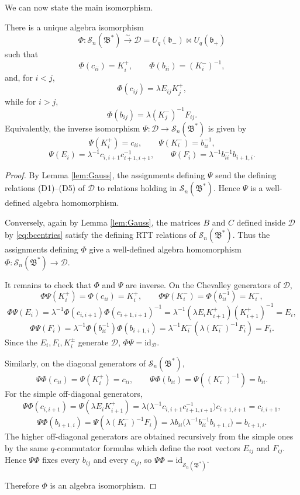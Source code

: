 \documentclass[11pt]{article}
\newcommand{\cS}{\mathcal S}
\newcommand{\fb}{\mathfrak b}
\newcommand{\Uq}{U_q}
\newcommand{\bipr}{\bowtie}
\newcommand{\id}{\mathrm{id}}
\begin{document}
We can now state the main isomorphism.

\begin{theorem}\label{thm:main}
There is a unique algebra isomorphism
\[
\Phi:\cS_n(\mathfrak B^*)\xrightarrow{\sim}\mathcal D
=\Uq(\fb_-)\bipr\Uq(\fb_+)
\]
such that
\[
\Phi(c_{ii})=K_i^+,\qquad
\Phi(b_{ii})=(K_i^-)^{-1},
\]
and, for \(i<j\),
\[
\Phi(c_{ij})=\lambda E_{ij}K_j^+,
\]
while for \(i>j\),
\[
\Phi(b_{ij})=\lambda (K_j^-)^{-1}F_{ij}.
\]
Equivalently, the inverse isomorphism \(\Psi:\mathcal D\to\cS_n(\mathfrak B^*)\) is given by
\[
\Psi(K_i^+)=c_{ii},\qquad
\Psi(K_i^-)=b_{ii}^{-1},
\]
\[
\Psi(E_i)=\lambda^{-1}c_{i,i+1}c_{i+1,i+1}^{-1},\qquad
\Psi(F_i)=\lambda^{-1}b_{ii}^{-1}b_{i+1,i}.
\]
\end{theorem}

\begin{proof}
By Lemma \ref{lem:Gauss}, the assignments defining \(\Psi\) send the defining relations (D1)--(D5) of \(\mathcal D\) to relations holding in \(\cS_n(\mathfrak B^*)\).  Hence \(\Psi\) is a well-defined algebra homomorphism.

Conversely, again by Lemma \ref{lem:Gauss}, the matrices \(B\) and \(C\) defined inside \(\mathcal D\) by \eqref{eq:bcentries} satisfy the defining RTT relations of \(\cS_n(\mathfrak B^*)\).  Thus the assignments defining \(\Phi\) give a well-defined algebra homomorphism \(\Phi:\cS_n(\mathfrak B^*)\to\mathcal D\).

It remains to check that \(\Phi\) and \(\Psi\) are inverse.  On the Chevalley generators of \(\mathcal D\),
\[
\Phi\Psi(K_i^+)=\Phi(c_{ii})=K_i^+,\qquad
\Phi\Psi(K_i^-)=\Phi(b_{ii}^{-1})=K_i^-,
\]
\[
\Phi\Psi(E_i)
=
\lambda^{-1}\Phi(c_{i,i+1})\Phi(c_{i+1,i+1})^{-1}
=
\lambda^{-1}(\lambda E_iK_{i+1}^+)(K_{i+1}^+)^{-1}=E_i,
\]
\[
\Phi\Psi(F_i)
=
\lambda^{-1}\Phi(b_{ii}^{-1})\Phi(b_{i+1,i})
=
\lambda^{-1}K_i^-(\lambda (K_i^-)^{-1}F_i)=F_i.
\]
Since the \(E_i,F_i,K_i^\pm\) generate \(\mathcal D\), \(\Phi\Psi=\id_{\mathcal D}\).

Similarly, on the diagonal generators of \(\cS_n(\mathfrak B^*)\),
\[
\Psi\Phi(c_{ii})=\Psi(K_i^+)=c_{ii},\qquad
\Psi\Phi(b_{ii})=\Psi((K_i^-)^{-1})=b_{ii}.
\]
For the simple off-diagonal generators,
\[
\Psi\Phi(c_{i,i+1})
=
\Psi(\lambda E_iK_{i+1}^+)
=
\lambda\bigl(\lambda^{-1}c_{i,i+1}c_{i+1,i+1}^{-1}\bigr)c_{i+1,i+1}
=c_{i,i+1},
\]
\[
\Psi\Phi(b_{i+1,i})
=
\Psi(\lambda (K_i^-)^{-1}F_i)
=
\lambda b_{ii}\bigl(\lambda^{-1}b_{ii}^{-1}b_{i+1,i}\bigr)
=b_{i+1,i}.
\]
The higher off-diagonal generators are obtained recursively from the simple ones by the same \(q\)-commutator formulas which define the root vectors \(E_{ij}\) and \(F_{ij}\).  Hence \(\Psi\Phi\) fixes every \(b_{ij}\) and every \(c_{ij}\), so \(\Psi\Phi=\id_{\cS_n(\mathfrak B^*)}\).

Therefore \(\Phi\) is an algebra isomorphism.
\end{proof}
\end{document}
